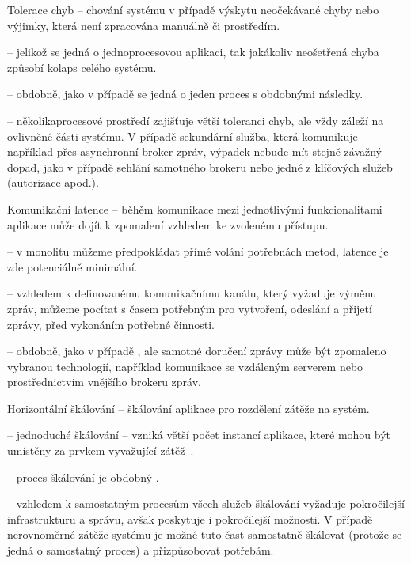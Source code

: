 \begin{dl}
   \item[Tolerace chyb] – chování systému v případě výskytu neočekávané chyby nebo výjimky, která není zpracována manuálně či  prostředím.
\end{dl}
\begin{ul}
   \item {} – jelikož se jedná o jednoprocesovou aplikaci, tak jakákoliv neošetřená chyba způsobí kolaps celého systému.
   \item {} – obdobně, jako v případě  se jedná o jeden proces s obdobnými následky.
   \item {} – několikaprocesové prostředí zajišťuje větší toleranci chyb, ale vždy záleží na ovlivněné části systému.
   V případě sekundární služba, která komunikuje například přes asynchronní broker zpráv, výpadek nebude mít stejně závažný dopad, jako v případě sehlání samotného brokeru nebo jedné z klíčových služeb (autorizace apod.).
\end{ul}

\begin{dl}
   \item[Komunikační latence] – běhěm komunikace mezi jednotlivými funkcionalitami aplikace může dojít k zpomalení vzhledem ke zvolenému přístupu.
\end{dl}
\begin{ul}
   \item {} – v monolitu můžeme předpokládat přímé volání potřebnách metod, latence je zde potenciálně minimální.
   \item {} – vzhledem k definovanému komunikačnímu kanálu, který vyžaduje výměnu zpráv, můžeme pocítat s časem potřebným pro vytvoření, odeslání a přijetí zprávy, před vykonáním potřebné činnosti.
   \item {} – obdobně, jako v případě , ale samotné doručení zprávy může být zpomaleno vybranou technologií, například komunikace se vzdáleným serverem nebo prostřednictvím vnějšího brokeru zpráv.
\end{ul}

\begin{dl}
   \item[Horizontální škálování] – škálování aplikace pro rozdělení zátěže na systém.
\end{dl}
\begin{ul}
   \item {} – jednoduché škálování – vzniká větší počet instancí aplikace, které mohou být umístěny za prvkem vyvažující zátěž~\cite{msachris}.
   \item {} – proces škálování je obdobný .
   \item {} – vzhledem k samostatným procesům všech služeb škálování vyžaduje pokročilejší infrastrukturu a správu, avšak poskytuje i pokročilejší možnosti.
   V případě nerovnoměrné zátěže systému je možné tuto čast samostatně škálovat (protože se jedná o samostatný proces) a přizpůsobovat potřebám. 
\end{ul}

